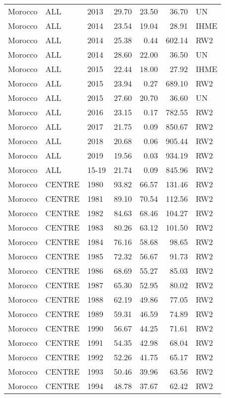 \begin{longtable}{lllrrrl}
  Morocco & ALL & 2013 & 29.70 & 23.50 & 36.70 & UN \\ 
  Morocco & ALL & 2014 & 23.54 & 19.04 & 28.91 & IHME \\ 
  Morocco & ALL & 2014 & 25.38 & 0.44 & 602.14 & RW2 \\ 
  Morocco & ALL & 2014 & 28.60 & 22.00 & 36.50 & UN \\ 
  Morocco & ALL & 2015 & 22.44 & 18.00 & 27.92 & IHME \\ 
  Morocco & ALL & 2015 & 23.94 & 0.27 & 689.10 & RW2 \\ 
  Morocco & ALL & 2015 & 27.60 & 20.70 & 36.60 & UN \\ 
  Morocco & ALL & 2016 & 23.15 & 0.17 & 782.55 & RW2 \\ 
  Morocco & ALL & 2017 & 21.75 & 0.09 & 850.67 & RW2 \\ 
  Morocco & ALL & 2018 & 20.68 & 0.06 & 905.44 & RW2 \\ 
  Morocco & ALL & 2019 & 19.56 & 0.03 & 934.19 & RW2 \\ 
  Morocco & ALL & 15-19 & 21.74 & 0.09 & 845.96 & RW2 \\ 
  Morocco & CENTRE & 1980 & 93.82 & 66.57 & 131.46 & RW2 \\ 
  Morocco & CENTRE & 1981 & 89.10 & 70.54 & 112.56 & RW2 \\ 
  Morocco & CENTRE & 1982 & 84.63 & 68.46 & 104.27 & RW2 \\ 
  Morocco & CENTRE & 1983 & 80.26 & 63.12 & 101.50 & RW2 \\ 
  Morocco & CENTRE & 1984 & 76.16 & 58.68 & 98.65 & RW2 \\ 
  Morocco & CENTRE & 1985 & 72.32 & 56.67 & 91.73 & RW2 \\ 
  Morocco & CENTRE & 1986 & 68.69 & 55.27 & 85.03 & RW2 \\ 
  Morocco & CENTRE & 1987 & 65.30 & 52.95 & 80.02 & RW2 \\ 
  Morocco & CENTRE & 1988 & 62.19 & 49.86 & 77.05 & RW2 \\ 
  Morocco & CENTRE & 1989 & 59.31 & 46.59 & 74.89 & RW2 \\ 
  Morocco & CENTRE & 1990 & 56.67 & 44.25 & 71.61 & RW2 \\ 
  Morocco & CENTRE & 1991 & 54.35 & 42.98 & 68.04 & RW2 \\ 
  Morocco & CENTRE & 1992 & 52.26 & 41.75 & 65.17 & RW2 \\ 
  Morocco & CENTRE & 1993 & 50.46 & 39.96 & 63.56 & RW2 \\ 
  Morocco & CENTRE & 1994 & 48.78 & 37.67 & 62.42 & RW2 \\ 

\end{longtable}
